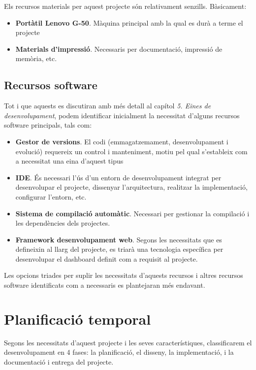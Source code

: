 Els recursos materials per aquest projecte són relativament senzills. Bàsicament:

\begin{itemize}
\item \textbf{Portàtil Lenovo G-50}. Màquina principal amb la qual es durà a terme el projecte
\item \textbf{Materials d'impressió}. Necessaris per documentació, impressió de memòria, etc.
\end{itemize}

\subsection{Recursos software}

Tot i que aquests es discutiran amb més detall al capítol \textit{5. Eines de desenvolupament}, podem identificar inicialment la necessitat d'alguns recursos software principals, tals com:

\begin{itemize}
\item \textbf{Gestor de versions}. El codi (emmagatzemament, desenvolupament i evolució) requereix un control i manteniment, motiu pel qual s'estableix com a necessitat una eina d'aquest tipus
\item \textbf{IDE}. És necessari l'ús d'un entorn de desenvolupament integrat per desenvolupar el projecte, dissenyar l'arquitectura, realitzar la implementació, configurar l'entorn, etc.
\item \textbf{Sistema de compilació automàtic}. Necessari per gestionar la compilació i les dependències dels projectes.
\item \textbf{Framework desenvolupament web}. Segons les necessitats que es defineixin al llarg del projecte, es triarà una tecnologia específica per desenvolupar el dashboard definit com a requisit al projecte.
\end{itemize}

Les opcions triades per suplir les necessitats d'aquests recursos i altres recursos software identificats com a necessaris es plantejaran més endavant.

\section{Planificació temporal}

Segons les necessitats d’aquest projecte i les seves característiques, classificarem el desenvolupament en 4 fases: la planificació, el disseny, la implementació, i la documentació i entrega del projecte. 

